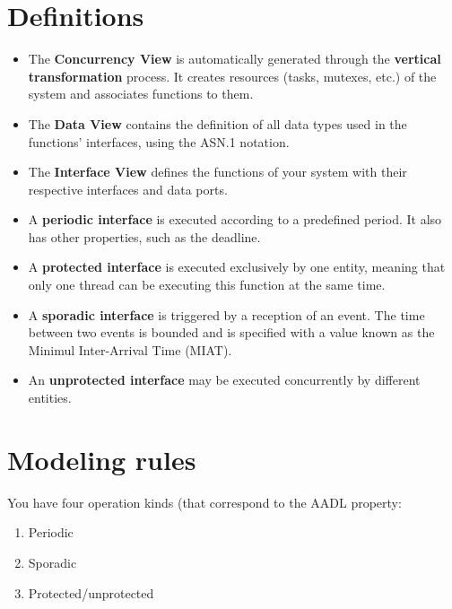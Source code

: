 \documentclass[11pt]{book}
\newcommand{\Concept}[1]{#1\xspace}
\newcommand{\aadl}{\Concept{AADL}}
\begin{document}
   \section{Definitions}
   \begin{itemize}
      \item
         The \textbf{Concurrency View} is automatically generated through the
         \textbf{vertical transformation} process. It creates resources (tasks,
         mutexes, etc.) of the system and associates functions to them.
      \item
         The \textbf{Data View} contains the definition of all data types used
         in the functions' interfaces, using the ASN.1 notation.
      \item
         The \textbf{Interface View} defines the functions of your system with
         their respective interfaces and data ports.
      \item
         A \textbf{periodic interface} is executed according to a predefined period. It
         also has other properties, such as the deadline.
      \item
         A \textbf{protected interface} is executed exclusively by one entity, meaning that
         only one thread can be executing this function at the same time.
      \item
         A \textbf{sporadic interface} is triggered by a reception of an event. The time
         between two events is bounded and is specified with a value known as
         the Minimul Inter-Arrival Time (MIAT).
      \item
         An \textbf{unprotected interface} may be executed concurrently by different 
         entities.
   \end{itemize}

   \section{Modeling rules}
   You have four operation kinds (that correspond to the \aadl property:
   \begin{enumerate}
      \item
         Periodic
      \item
         Sporadic
      \item
         Protected/unprotected
   \end{enumerate}
\end{document}
